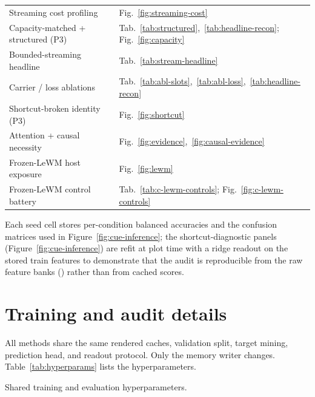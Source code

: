 \begin{table}[h]
\begin{tabularx}{\linewidth}{lYl}
Streaming cost profiling
  & 
  & Fig.~\ref{fig:streaming-cost}\\
Capacity-matched + structured (P3)
  & 
  & Tab.~\ref{tab:structured},~\ref{tab:headline-recon}; Fig.~\ref{fig:capacity}\\
Bounded-streaming headline
  & 
  & Tab.~\ref{tab:stream-headline}\\
Carrier / loss ablations
  & 
  & Tab.~\ref{tab:abl-slots},~\ref{tab:abl-loss},~\ref{tab:headline-recon}\\
Shortcut-broken identity (P3)
  & 
  & Fig.~\ref{fig:shortcut}\\
Attention + causal necessity
  & 
  & Fig.~\ref{fig:evidence},~\ref{fig:causal-evidence}\\
Frozen-LeWM host exposure
  & 
  & Fig.~\ref{fig:lewm}\\
Frozen-LeWM control battery
  & 
  & Tab.~\ref{tab:c-lewm-controls}; Fig.~\ref{fig:c-lewm-controls}\\
\bottomrule
\end{tabularx}
\end{table}

Each seed cell stores per-condition balanced accuracies and the confusion
matrices used in Figure~\ref{fig:cue-inference};
the shortcut-diagnostic panels (Figure~\ref{fig:cue-inference}) are refit at plot
time with a ridge readout on the stored train features to demonstrate that the
audit is reproducible from the raw feature banks () rather
than from cached scores.

\section{Training and audit details}
\label{app:training}

All methods share the same rendered caches, validation split, target mining,
prediction head, and readout protocol.  Only the memory writer changes.
Table~\ref{tab:hyperparams} lists the hyperparameters.

\begin{table}[h]
\centering
\footnotesize
\caption{Shared training and evaluation hyperparameters.}
\label{tab:hyperparams}

\end{table}

